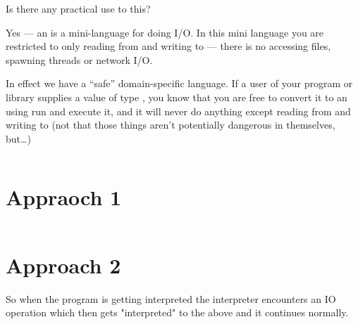 \documentclass[thesis-solanki.tex]{subfiles}
\begin{document}
Is there any practical use to this?

Yes ---
an  is a mini-language for doing I/O. In this mini language you are restricted to only reading from  and writing to  ---
there is no accessing files, spawning threads or network I/O.

In effect we have a 
``safe'' domain-specific language.
If a user of your program or library supplies a value of type  , you know that you are free to convert it to an   using run and execute it, 
and it will never do anything except reading from  and writing to  (not that those things aren't potentially dangerous in themselves, but\dots)

\begin{code-list}[H]

\begin{singlespace}
  \inputminted[linenos]{haskell}{haskell-proto4-purvey-wincer.hs}
\end{singlespace}

\caption{}
\label{}
\end{code-list}



\section{Appraoch 1}

\begin{code-list}[H]

\begin{singlespace}
  \inputminted[linenos]{haskell}{haskell-proto4-myrtle-uppers.hs}
\end{singlespace}

\caption{}
\label{}
\end{code-list}


\section{Approach 2}

So when the program is getting interpreted the interpreter encounters an IO operation which then gets "interpreted" to the above and it 
continues normally.
\end{document}
